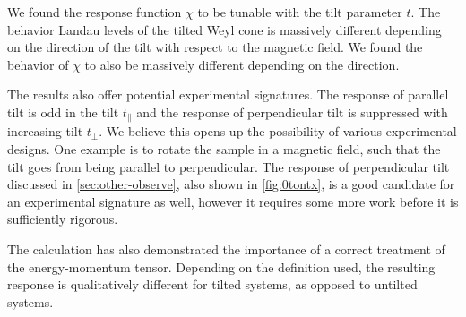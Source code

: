 We found the response function \( \chi \) to be tunable with the tilt parameter \( t \).
The behavior Landau levels of the tilted Weyl cone is massively different depending on the direction of the tilt with respect to the magnetic field.
We found the behavior of \( \chi \) to also be massively different depending on the direction.

The results also offer potential experimental signatures.
The response of parallel tilt is odd in the tilt \( t_\parallel \) and the response of perpendicular tilt is suppressed with increasing tilt \( t_\perp \).
We believe this opens up the possibility of various experimental designs.
One example is to rotate the sample in a magnetic field, such that the tilt goes from being parallel to perpendicular.
The response of perpendicular tilt discussed in \cref{sec:other-observe}, also shown in \cref{fig:0tontx}, is a good candidate for an experimental signature as well, however it requires some more work before it is sufficiently rigorous.


The calculation has also demonstrated the importance of a correct treatment of the energy-momentum tensor.
Depending on the definition used, the resulting response is qualitatively different for tilted systems, as opposed to untilted systems.

